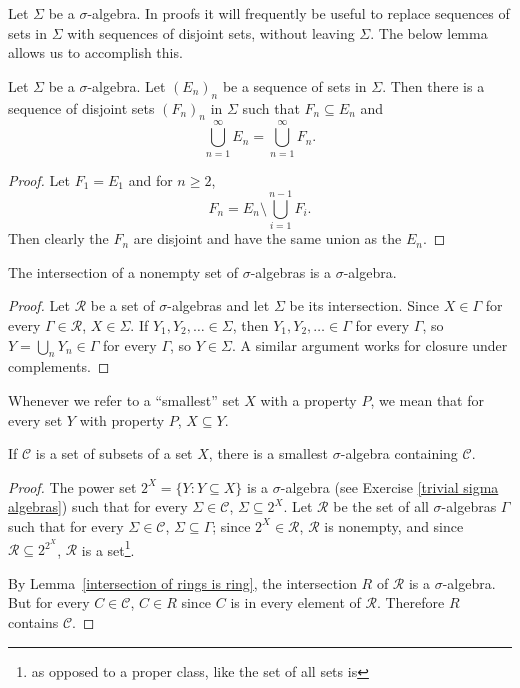 \begin{subsec}
Let $\Sigma$ be a $\sigma$-algebra.
In proofs it will frequently be useful to replace sequences of sets in $\Sigma$ with sequences of disjoint sets, without leaving $\Sigma$.
The below lemma allows us to accomplish this.
\end{subsec}

\begin{lemma}
Let $\Sigma$ be a $\sigma$-algebra.
Let ${(E_{n})}_{n}$ be a sequence of sets in $\Sigma$. Then there is a sequence of disjoint sets ${(F_{n})}_{n}$ in $\Sigma$ such that $F_{n} \subseteq E_{n}$ and
\[\bigcup_{n=1}^{\infty} E_{n} = \bigcup_{n=1}^{\infty} F_{n}.\]
\end{lemma}
\begin{proof}
Let $F_{1} = E_{1}$ and for $n \geq 2$,
\[F_{n} = E_{n} \setminus \bigcup_{i=1}^{n-1} F_{i}.\]
Then clearly the $F_{n}$ are disjoint and have the same union as the $E_{n}$.
\end{proof}

\begin{lemma}\label{intersection of rings is ring}
The intersection of a nonempty set of $\sigma$-algebras is a $\sigma$-algebra.
\end{lemma}
\begin{proof}
Let $\mathcal R$ be a set of $\sigma$-algebras and let $\Sigma$ be its intersection.
Since $X \in \Gamma$ for every $\Gamma \in \mathcal R$, $X \in \Sigma$.
If $Y_1, Y_2, \dots \in \Sigma$, then $Y_1, Y_2, \dots \in \Gamma$ for every $\Gamma$, so $Y = \bigcup_n Y_n \in \Gamma$ for every $\Gamma$, so $Y \in \Sigma$.
A similar argument works for closure under complements.
\end{proof}

\begin{subsec}
Whenever we refer to a ``smallest'' set $X$ with a property $P$, we mean that for every set $Y$ with property $P$, $X \subseteq Y$.
\end{subsec}

\begin{lemma}
If $\mathcal C$ is a set of subsets of a set $X$, there is a smallest $\sigma$-algebra containing $\mathcal C$.
\end{lemma}
\begin{proof}
The power set $2^{X} = \{Y: Y \subseteq X\}$ is a $\sigma$-algebra (see Exercise \ref{trivial sigma algebras}) such that for every $\Sigma \in \mathcal C$, $\Sigma \subseteq 2^{X}$.
Let $\mathcal R$ be the set of all $\sigma$-algebras $\Gamma$ such that for every $\Sigma \in \mathcal C$, $\Sigma \subseteq \Gamma$; since $2^{X} \in \mathcal R$, $\mathcal R$ is nonempty, and since $\mathcal R \subseteq 2^{2^{X}}$, $\mathcal R$ is a set\footnote{as opposed to a proper class, like the set of all sets is}.

By Lemma~\ref{intersection of rings is ring}, the intersection $R$ of $\mathcal R$ is a $\sigma$-algebra.
But for every $C \in \mathcal C$, $C \in R$ since $C$ is in every element of $\mathcal R$.
Therefore $R$ contains $\mathcal C$.
\end{proof}

